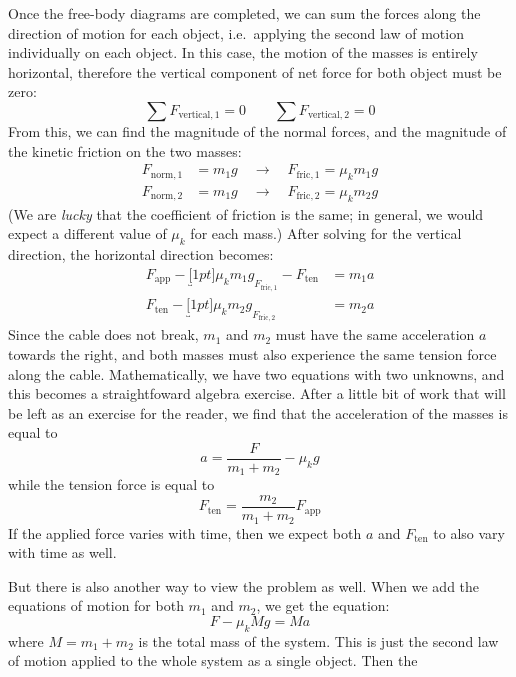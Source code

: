 Once the free-body diagrams are completed, we can sum the forces along the
direction of motion for each object, i.e.\ applying the second law of motion
individually on each object. In this case, the motion of the masses is entirely
horizontal, therefore the vertical component of net force for both object must
be zero:
\begin{equation*}
  \sum F_{\text{vertical},1}=0\quad\quad\sum F_{\text{vertical},2}=0
\end{equation*}
From this, we can find the magnitude of the normal forces, and the magnitude of
the kinetic friction on the two masses:
\begin{align*}
  F_{\text{norm},1}&=m_1g\quad\rightarrow\quad F_{\text{fric},1}=\mu_km_1g\\
  F_{\text{norm},2}&=m_1g\quad\rightarrow\quad F_{\text{fric},2}=\mu_km_2g
\end{align*}
(We are \emph{lucky} that the coefficient of friction is the same; in general,
we would expect a different value of $\mu_k$ for each mass.) After solving for
the vertical direction, the horizontal direction becomes:
\begin{align*}
  F_\text{app}-\underbracket[1pt]{\mu_km_1g}_{F_{\text{fric},1}}-F_\text{ten} &= m_1a\\
  F_\text{ten}-\underbracket[1pt]{\mu_km_2g}_{F_{\text{fric},2}} &= m_2a
\end{align*}
Since the cable does not break, $m_1$ and $m_2$ must have the same acceleration
$a$ towards the right, and both masses must also experience the same tension
force along the cable. Mathematically, we have two equations with two unknowns,
and this becomes a straightfoward algebra exercise. After a little bit of work
that will be left as an exercise for the reader, we find that the acceleration
of the masses is equal to
\begin{equation*}
  a=\frac F{m_1+m_2}-\mu_k g
\end{equation*}
while the tension force is equal to
\begin{equation*}
  F_\text{ten} =\frac{m_2}{m_1+m_2} F_\text{app}
\end{equation*}
If the applied force varies with time, then we expect both $a$ and $F_\text{ten}$
to also vary with time as well.

But there is also another way to view the problem as well. When we add the
equations of motion for both $m_1$ and $m_2$, we get the equation:
\begin{equation*}
  F-\mu_kMg = Ma
\end{equation*}
where $M=m_1+m_2$ is the total mass of the system. This is just the second law
of motion applied to the whole system as a single object. Then the 

